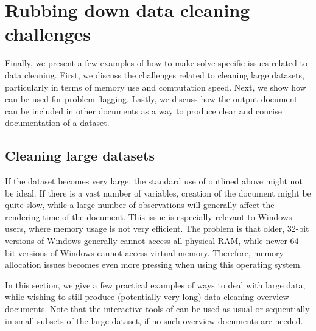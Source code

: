 \documentclass[article,shortnames]{jss}
\newcommand{\hl}[1]{\textcolor{magenta}{#1}}
\newcommand{\R}[1]{\code{#1}}
\begin{document}
\section{Rubbing down data cleaning challenges}
\label{sec:specificExamples}

Finally, we present a few examples of how to make 
solve specific issues related to data cleaning. First, we discuss the
challenges related to cleaning large datasets, particularly in terms
of memory use and computation speed. Next, we show how 
can be used for problem-flagging. Lastly, we discuss how the
 output document can be included in other 
documents as a way to produce clear and concise documentation of a
dataset. %

\subsection{Cleaning large datasets}
If the dataset becomes very large, the standard use of \R{clean()}
outlined above might not be ideal. If there is a vast number of
variables, creation of the  document might be quite
slow, while a large number of observations will generally affect the
rendering time of the document. This issue is especially relevant to 
Windows users, where memory usage is not very efficient. The problem is that older,
32-bit versions of Windows generally cannot access all physical RAM,
while newer 64-bit versions of Windows cannot access virtual memory. Therefore,
memory allocation issues becomes even more pressing when using this operating system. 


In this section, we give a few
practical examples of ways to deal with large data, while wishing to
still produce (potentially very long) data cleaning overview
documents. Note that the interactive tools of  can be used
as usual or sequentially in small subsets of the large dataset, if no
such overview documents are needed.
\end{document}
